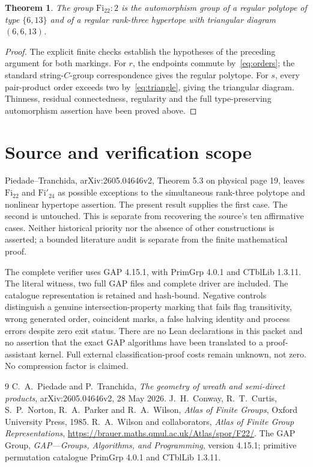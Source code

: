 \documentclass[11pt]{article}
\newtheorem{theorem}{Theorem}
\begin{document}
\begin{theorem}
The group $\mathrm{Fi}_{22}:2$ is the automorphism group of a regular polytope of type $\{6,13\}$ and of a regular rank-three hypertope with triangular diagram $(6,6,13)$.
\end{theorem}
\begin{proof}
The explicit finite checks establish the hypotheses of the preceding argument for both markings. For $r$, the endpoints commute by~\eqref{eq:orders}; the standard string-$C$-group correspondence gives the regular polytope. For $s$, every pair-product order exceeds two by~\eqref{eq:triangle}, giving the triangular diagram. Thinness, residual connectedness, regularity and the full type-preserving automorphism assertion have been proved above.
\end{proof}
\section{Source and verification scope}
Piedade--Tranchida, arXiv:2605.04646v2, Theorem 5.3 on physical page 19, leaves $\mathrm{Fi}_{22}$ and $\mathrm{Fi}'_{24}$ as possible exceptions to the simultaneous rank-three polytope and nonlinear hypertope assertion. The present result supplies the first case. The second is untouched. This is separate from recovering the source's ten affirmative cases. Neither historical priority nor the absence of other constructions is asserted; a bounded literature audit is separate from the finite mathematical proof.

The complete verifier uses GAP 4.15.1, with PrimGrp 4.0.1 and CTblLib 1.3.11. The literal witness, two full GAP files and complete driver are included. The catalogue representation is retained and hash-bound. Negative controls distinguish a genuine intersection-property marking that fails flag transitivity, wrong generated order, coincident marks, a false halving identity and process errors despite zero exit status. There are no Lean declarations in this packet and no assertion that the exact GAP algorithms have been translated to a proof-assistant kernel. Full external classification-proof costs remain unknown, not zero. No compression factor is claimed.
\begin{thebibliography}{9}
 C.~A.~Piedade and P.~Tranchida, \emph{The geometry of wreath and semi-direct products}, arXiv:2605.04646v2, 28 May 2026.
 J.~H.~Conway, R.~T.~Curtis, S.~P.~Norton, R.~A.~Parker and R.~A.~Wilson, \emph{Atlas of Finite Groups}, Oxford University Press, 1985.
 R.~A.~Wilson and collaborators, \emph{Atlas of Finite Group Representations}, \url{https://brauer.maths.qmul.ac.uk/Atlas/spor/F22/}.
 The GAP Group, \emph{GAP---Groups, Algorithms, and Programming}, version 4.15.1; primitive permutation catalogue PrimGrp 4.0.1 and CTblLib 1.3.11.
\end{thebibliography}
\end{document}
